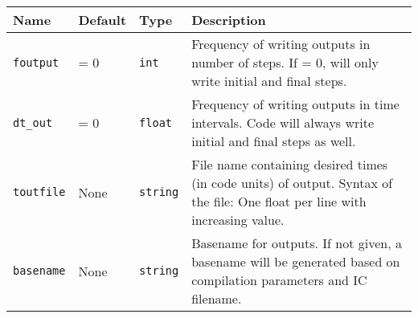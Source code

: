 \begin{tabular}[c]{p{2.5cm} p{1.5cm} p{} p{}}
Name & Default & Type & Description
\\
\hline
\hline
\texttt{foutput} &
    = 0 &
    \texttt{int} &
    Frequency of writing outputs in number of steps. If = 0, will only write
    initial and final steps.
\\ \hline
\texttt{dt\_out} &
    = 0 &
    \texttt{float} &
    Frequency of writing outputs in time intervals. Code will always write
    initial and final steps as well.
\\ \hline
\texttt{toutfile} &
    None &
    \texttt{string} &
    File name containing desired times (in code units) of output. Syntax of the
    file: One float per line with increasing value.
\\ \hline
\texttt{basename} &
    None &
    \texttt{string} &
    Basename for outputs. If not given, a basename will be generated based on
    compilation parameters and IC filename.
\\ \hline
\end{tabular}






%
%
%















